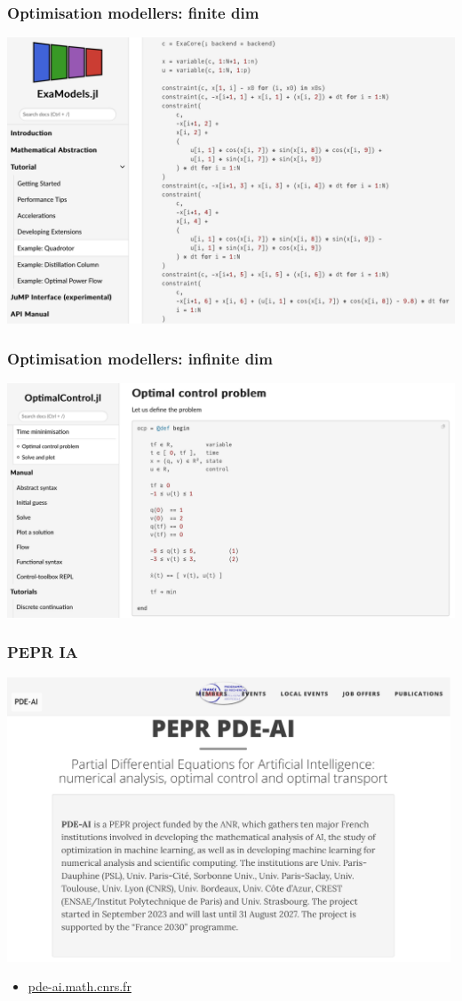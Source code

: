 \documentclass[9pt]{beamer}
\begin{document}
\begin{frame}
\frametitle{\bf Optimisation modellers: finite dim}

\centering \includegraphics[width=1.0\textwidth]{examodels}

\end{frame}

\begin{frame}
\frametitle{\bf Optimisation modellers: infinite dim}

\centering \includegraphics[width=1.05\textwidth]{ct}

\end{frame}

\begin{frame}
\frametitle{\bf PEPR IA}

\centering \includegraphics[width=0.99\textwidth]{pdeai}

\begin{itemize} 
\item \href{https://pde-ai.math.cnrs.fr}{pde-ai.math.cnrs.fr}
\end{itemize} 

\end{frame}
\end{document}
